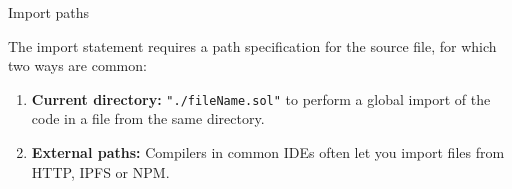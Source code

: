 \documentclass[handout]{beamer}
\begin{document}
\begin{frame}{Import paths}

\vspace{0.5em}
The import statement requires a path specification for the source file, for which two ways are common:
\vspace{0.5em}

\begin{enumerate}
	\item	\textbf{Current directory:}  \color{red} \texttt{{"./fileName.sol"}} \color{black} to perform a global import of the code in a file from the same directory.
	\item	\textbf{External paths:} Compilers in common IDEs often let you import files from HTTP, IPFS or NPM.
\end{enumerate}

\vspace{0.5em}


\end{frame}
\end{document}
